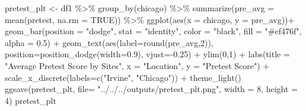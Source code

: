 \documentclass[
  letterpaper,
  DIV=11,
  numbers=noendperiod]{scrartcl}
\newenvironment{Shaded}{\begin{snugshade}}{\end{snugshade}}
\newcommand{\AttributeTok}[1]{\textcolor[rgb]{0.49,0.56,0.16}{#1}}
\newcommand{\ConstantTok}[1]{\textcolor[rgb]{0.53,0.00,0.00}{#1}}
\newcommand{\DecValTok}[1]{\textcolor[rgb]{0.25,0.63,0.44}{#1}}
\newcommand{\FloatTok}[1]{\textcolor[rgb]{0.25,0.63,0.44}{#1}}
\newcommand{\FunctionTok}[1]{\textcolor[rgb]{0.02,0.16,0.49}{#1}}
\newcommand{\NormalTok}[1]{\textcolor[rgb]{0.00,0.44,0.13}{#1}}
\newcommand{\OtherTok}[1]{\textcolor[rgb]{0.00,0.44,0.13}{#1}}
\newcommand{\SpecialCharTok}[1]{\textcolor[rgb]{0.25,0.44,0.63}{#1}}
\newcommand{\StringTok}[1]{\textcolor[rgb]{0.25,0.44,0.63}{#1}}
\begin{document}
\begin{Shaded}
\begin{Highlighting}[]
\NormalTok{pretest\_plt }\OtherTok{\textless{}{-}}\NormalTok{ df1 }\SpecialCharTok{\%\textgreater{}\%} \FunctionTok{group\_by}\NormalTok{(chicago) }\SpecialCharTok{\%\textgreater{}\%} \FunctionTok{summarize}\NormalTok{(}\AttributeTok{pre\_avg =} \FunctionTok{mean}\NormalTok{(pretest, }\AttributeTok{na.rm =} \ConstantTok{TRUE}\NormalTok{)) }\SpecialCharTok{\%\textgreater{}\%} \FunctionTok{ggplot}\NormalTok{(}\FunctionTok{aes}\NormalTok{(}\AttributeTok{x =}\NormalTok{ chicago, }\AttributeTok{y =}\NormalTok{ pre\_avg))}\SpecialCharTok{+} 
  \FunctionTok{geom\_bar}\NormalTok{(}\AttributeTok{position =} \StringTok{"dodge"}\NormalTok{, }\AttributeTok{stat =} \StringTok{"identity"}\NormalTok{, }\AttributeTok{color =} \StringTok{"black"}\NormalTok{,}
           \AttributeTok{fill =} \StringTok{"\#ef476f"}\NormalTok{, }\AttributeTok{alpha =} \FloatTok{0.5}\NormalTok{) }\SpecialCharTok{+} 
  \FunctionTok{geom\_text}\NormalTok{(}\FunctionTok{aes}\NormalTok{(}\AttributeTok{label=}\FunctionTok{round}\NormalTok{(pre\_avg,}\DecValTok{2}\NormalTok{)),  }\AttributeTok{position=}\FunctionTok{position\_dodge}\NormalTok{(}\AttributeTok{width=}\FloatTok{0.9}\NormalTok{), }
            \AttributeTok{vjust=}\SpecialCharTok{{-}}\FloatTok{0.25}\NormalTok{) }\SpecialCharTok{+}
  \FunctionTok{ylim}\NormalTok{(}\DecValTok{0}\NormalTok{,}\DecValTok{1}\NormalTok{) }\SpecialCharTok{+}
  \FunctionTok{labs}\NormalTok{(}\AttributeTok{title =} \StringTok{"Average Pretest Score by Sites"}\NormalTok{,}
    \AttributeTok{x =} \StringTok{"Location"}\NormalTok{, }\AttributeTok{y =} \StringTok{"Pretest Score"}\NormalTok{) }\SpecialCharTok{+} 
  \FunctionTok{scale\_x\_discrete}\NormalTok{(}\AttributeTok{labels=}\FunctionTok{c}\NormalTok{(}\StringTok{"Irvine"}\NormalTok{, }\StringTok{"Chicago"}\NormalTok{)) }\SpecialCharTok{+}
  \FunctionTok{theme\_light}\NormalTok{()}
\FunctionTok{ggsave}\NormalTok{(pretest\_plt, }
       \AttributeTok{file=} \StringTok{"../../../outputs/pretest\_plt.png"}\NormalTok{, }
       \AttributeTok{width =} \DecValTok{8}\NormalTok{, }\AttributeTok{height =} \DecValTok{4}\NormalTok{)}
\NormalTok{pretest\_plt}
\end{Highlighting}
\end{Shaded}
\end{document}
